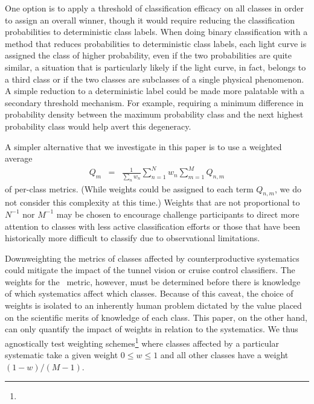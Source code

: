 One option is to apply a threshold of classification efficacy on all classes in order to assign an overall winner, though it would require reducing the classification probabilities to deterministic class labels.
When doing binary classification with a method that reduces probabilities to deterministic class labels, each light curve is assigned the class of higher probability, even if the two probabilities are quite similar, a situation that is particularly likely if the light curve, in fact, belongs to a third class or if the two classes are subclasses of a single physical phenomenon.
A simple reduction to a deterministic label could be made more palatable with a secondary threshold mechanism.
For example, requiring a minimum difference in probability density between the maximum probability class and the next highest probability class would help avert this degeneracy.

A simpler alternative that we investigate in this paper is to use a weighted average
\begin{eqnarray}
  \label{eq:weightavg}
  Q_{m} &=& \frac{1}{\sum_{n} w_{n}} \sum_{n=1}^{N} w_{n} \sum_{m=1}^{M} Q_{n, m}
\end{eqnarray}
of per-class metrics.
(While weights could be assigned to each term $Q_{n, m}$, we do not consider this complexity at this time.)
Weights that are not proportional to $N^{-1}$ nor $M^{-1}$ may be chosen to encourage challenge participants to direct more attention to classes with less active classification efforts or those that have been historically more difficult to classify due to observational limitations.

Downweighting the metrics of classes affected by counterproductive systematics could mitigate the impact of the tunnel vision or cruise control classifiers.
The weights for the \plasticc\ metric, however, must be determined before there is knowledge of which systematics affect which classes.
Because of this caveat, the choice of weights is isolated to an inherently human problem dictated by the value placed on the scientific merits of knowledge of each class.
This paper, on the other hand, can only quantify the impact of weights in relation to the systematics.
We thus agnostically test weighting schemes\footnote{} where classes affected by a particular systematic take a given weight $0 \leq w \leq 1$ and all other classes have a weight $(1 - w) / (M - 1)$.
